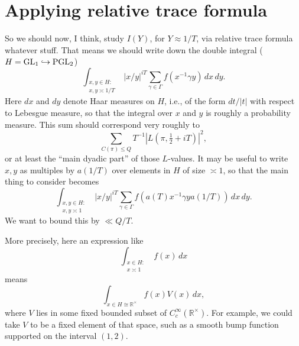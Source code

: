 \documentclass[reqno]{amsart} 
\begin{document}
\section{Applying relative trace formula}\label{sec:20230522180028}
So we should now, I think, study $I(Y)$, for $Y \approx 1/T$, via relative trace formula whatever stuff.  That means we should write down the double integral ($H = \operatorname{GL}_1 \hookrightarrow \operatorname{PGL}_2$)
\begin{equation*}
  \int _{
    \substack{
      x, y \in H :  \\
       x, y \asymp 1/T
    }
  }
  \lvert x/y \rvert ^{i T}
  \sum _{\gamma \in \Gamma }
  f (x ^{-1} \gamma y) \, d x \, d y.
\end{equation*}
Here $d x$ and $d y$ denote Haar measures on $H$, i.e., of the form $d t / |t|$ with respect to Lebesgue measure, so that the integral over $x$ and $y$ is roughly a probability measure.  This sum should correspond very roughly to
\begin{equation*}
  \sum _{C(\pi) \leq Q}
  T^{-1} \left\lvert L(\pi, \tfrac{1}{2} + i T) \right\rvert^2,
\end{equation*}
or at least the ``main dyadic part'' of those $L$-values.  It may be useful to write $x, y$ as multiples by $a(1/T)$ over elements in $H$ of size $\asymp 1$, so that the main thing to consider becomes
\begin{equation*}
  \int _{
    \substack{
      x, y \in H :  \\
       x, y \asymp 1
    }
  }
  \lvert x/y \rvert ^{i T}
  \sum _{\gamma \in \Gamma }
  f (a(T) x ^{-1}  \gamma y a(1/T) ) \, d x \, d y.
\end{equation*}
We want to bound this by $\ll Q/T$.

\begin{remark}
More precisely, here an expression like
\begin{equation*}
  \int_{
    \substack{
      x \in H :  \\
       x \asymp 1
    }
  }
  f(x) \, d x
\end{equation*}
means
\begin{equation*}
  \int_{x \in H \cong \mathbb{R}^\times }
  f(x) V(x) \, d x,
\end{equation*}
where $V$ lies in some fixed bounded subset of $C_c^\infty(\mathbb{R}^\times)$.  For example, we could take $V$ to be a fixed element of that space, such as a smooth bump function supported on the interval $(1,2)$.
\end{remark}
\end{document}
